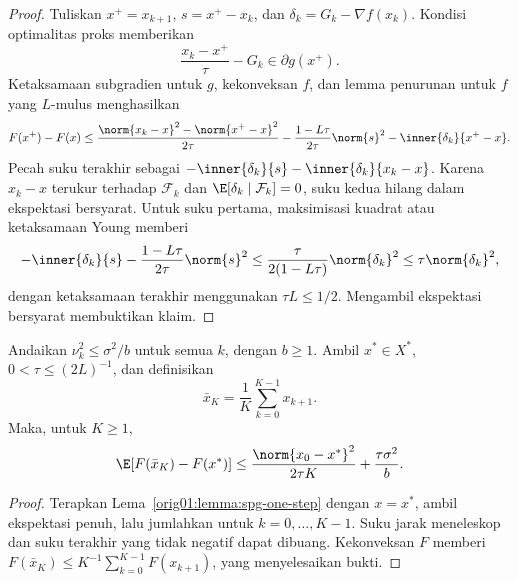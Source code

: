 \begin{proof}
  Tuliskan $x^+=x_{k+1}$,
  $s=x^+-x_k$, dan $\delta_k=G_k-\nabla f(x_k)$. Kondisi optimalitas
  proks memberikan
  \begin{equation}
    \frac{x_k-x^+}{\tau}-G_k\in\partial g(x^+).
  \end{equation}
  Ketaksamaan subgradien untuk $g$, kekonveksan $f$, dan lemma penurunan untuk
  $f$ yang $L$-mulus menghasilkan
  \begin{multline}
    F(x^+)-F(x)
    \leq
    \frac{\norm{x_k-x}^2-\norm{x^+-x}^2}{2\tau}
    -\frac{1-L\tau}{2\tau}\norm{s}^2
    -\inner{\delta_k}{x^+-x}.
    \label{orig01:eq:spg-pathwise}
  \end{multline}
  Pecah suku terakhir sebagai
  $-\inner{\delta_k}{s}-\inner{\delta_k}{x_k-x}$. Karena
  $x_k-x$ terukur terhadap $\mathcal F_k$ dan
  $\E[\delta_k\mid\mathcal F_k]=0$, suku kedua hilang dalam ekspektasi
  bersyarat. Untuk suku pertama, maksimisasi kuadrat atau ketaksamaan Young
  memberi
  \begin{equation}
    -\inner{\delta_k}{s}
    -\frac{1-L\tau}{2\tau}\norm{s}^2
    \leq\frac{\tau}{2(1-L\tau)}\norm{\delta_k}^2
    \leq\tau\norm{\delta_k}^2,
  \end{equation}
  dengan ketaksamaan terakhir menggunakan $\tau L\leq1/2$. Mengambil
  ekspektasi bersyarat membuktikan klaim.
\end{proof}

\begin{theorem}
  \label{orig01:theorem:spg-ergodic}
  Andaikan $\nu_k^2\leq\sigma^2/b$ untuk semua $k$, dengan $b\geq1$.
  Ambil $x^*\in X^*$, $0<\tau\leq(2L)^{-1}$, dan definisikan
  \begin{equation}
    \bar x_K=\frac1K\sum_{k=0}^{K-1}x_{k+1}.
  \end{equation}
  Maka, untuk $K\geq1$,
  \begin{equation}
    \label{orig01:eq:spg-ergodic-rate}
    \E[F(\bar x_K)-F(x^*)]
    \leq
    \frac{\norm{x_0-x^*}^2}{2\tau K}
    +\frac{\tau\sigma^2}{b}.
  \end{equation}
\end{theorem}

\begin{proof}
  Terapkan Lema~\ref{orig01:lemma:spg-one-step} dengan $x=x^*$, ambil
  ekspektasi penuh, lalu jumlahkan untuk $k=0,\dots,K-1$. Suku jarak
  meneleskop dan suku terakhir yang tidak negatif dapat dibuang. Kekonveksan
  $F$ memberi
  $F(\bar x_K)\leq K^{-1}\sum_{k=0}^{K-1}F(x_{k+1})$, yang menyelesaikan
  bukti.
\end{proof}

